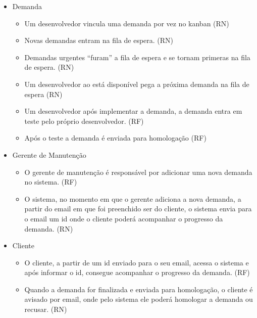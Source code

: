 \begin{itemize}
	\item Demanda
		\begin{itemize}
			\item Um desenvolvedor vincula uma demanda por vez no kanban (RN)

			\item Novas demandas entram na fila de espera. (RN)

			\item Demandas urgentes “furam” a fila de espera e se tornam primeras na fila de espera. (RN)

			\item Um desenvolvedor ao está disponível pega a próxima demanda na fila de espera (RN)

			\item Um desenvolvedor após implementar a demanda, a demanda entra em teste pelo próprio desenvolvedor. (RF)

			\item Após o teste a demanda é enviada para homologação (RF)
		\end{itemize}
	\item Gerente de Manutenção
		\begin{itemize}
			\item O gerente de manutenção é responsável por adicionar uma nova demanda no sistema. (RF)

			\item O sistema, no momento em que o gerente adiciona a nova demanda, a partir do email em que foi preenchido ser do cliente, o sistema envia para o email um id onde o cliente poderá acompanhar o progresso da demanda. (RN)
		\end{itemize}
	\item Cliente
		\begin{itemize}
			\item O cliente, a partir de um id enviado para o seu email, acessa o sistema e após informar o id, consegue acompanhar o progresso da demanda. (RF)
			\item Quando a demanda for finalizada e enviada para homologação, o cliente é avisado por email, onde pelo sistema ele poderá homologar a demanda ou recusar. (RN)
		\end{itemize}
\end{itemize}
